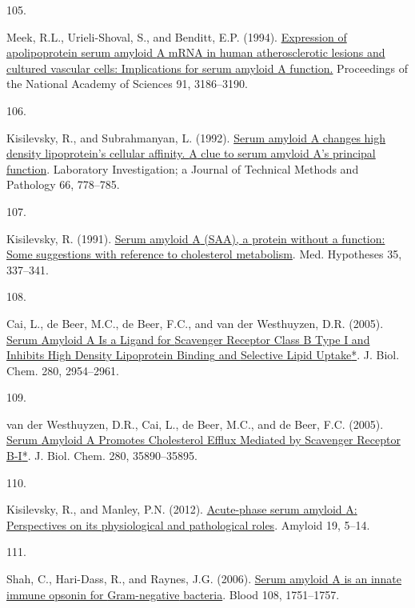 \documentclass[
]{article}
\newlength{\cslhangindent}
\newlength{\csllabelwidth}
\newlength{\cslentryspacingunit} %
\newenvironment{CSLReferences}[2] %
 {%
  \setlength{\parindent}{0pt}
  \ifodd #1
  \let\oldpar\par
  \def\par{\hangindent=\cslhangindent\oldpar}
  \fi
  \setlength{\parskip}{#2\cslentryspacingunit}
 }%
 {}
\newcommand{\CSLLeftMargin}[1]{\parbox[t]{\csllabelwidth}{#1}}
\newcommand{\CSLRightInline}[1]{\parbox[t]{\linewidth - \csllabelwidth}{#1}\break}
\begin{document}
\begin{CSLReferences}{0}{0}
\leavevmode{}%
\CSLLeftMargin{105. }
\CSLRightInline{Meek, R.L., Urieli-Shoval, S., and Benditt, E.P. (1994). \href{https://doi.org/10.1073/pnas.91.8.3186}{Expression of apolipoprotein serum amyloid {A mRNA} in human atherosclerotic lesions and cultured vascular cells: Implications for serum amyloid {A} function.} Proceedings of the National Academy of Sciences 91, 3186--3190.}

\leavevmode{}%
\CSLLeftMargin{106. }
\CSLRightInline{Kisilevsky, R., and Subrahmanyan, L. (1992). \href{https://www.ncbi.nlm.nih.gov/pubmed/1602745}{Serum amyloid {A} changes high density lipoprotein's cellular affinity. {A} clue to serum amyloid {A}'s principal function}. Laboratory Investigation; a Journal of Technical Methods and Pathology 66, 778--785.}

\leavevmode{}%
\CSLLeftMargin{107. }
\CSLRightInline{Kisilevsky, R. (1991). \href{https://doi.org/10.1016/0306-9877(91)90280-C}{Serum amyloid {A} ({SAA}), a protein without a function: {Some} suggestions with reference to cholesterol metabolism}. Med. Hypotheses 35, 337--341.}

\leavevmode{}%
\CSLLeftMargin{108. }
\CSLRightInline{Cai, L., de Beer, M.C., de Beer, F.C., and van der Westhuyzen, D.R. (2005). \href{https://doi.org/10.1074/jbc.M411555200}{Serum {Amyloid A Is} a {Ligand} for {Scavenger Receptor Class B Type I} and {Inhibits High Density Lipoprotein Binding} and {Selective Lipid Uptake}*}. J. Biol. Chem. 280, 2954--2961.}

\leavevmode{}%
\CSLLeftMargin{109. }
\CSLRightInline{van der Westhuyzen, D.R., Cai, L., de Beer, M.C., and de Beer, F.C. (2005). \href{https://doi.org/10.1074/jbc.M505685200}{Serum {Amyloid A Promotes Cholesterol Efflux Mediated} by {Scavenger Receptor B-I}*}. J. Biol. Chem. 280, 35890--35895.}

\leavevmode{}%
\CSLLeftMargin{110. }
\CSLRightInline{Kisilevsky, R., and Manley, P.N. (2012). \href{https://doi.org/10.3109/13506129.2011.654294}{Acute-phase serum amyloid {A}: {Perspectives} on its physiological and pathological roles}. Amyloid 19, 5--14.}

\leavevmode{}%
\CSLLeftMargin{111. }
\CSLRightInline{Shah, C., Hari-Dass, R., and Raynes, J.G. (2006). \href{https://doi.org/10.1182/blood-2005-11-011932}{Serum amyloid {A} is an innate immune opsonin for {Gram-negative} bacteria}. Blood 108, 1751--1757.}


\end{CSLReferences}
\end{document}
